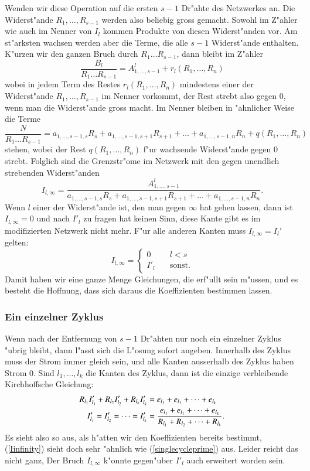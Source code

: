 Wenden wir diese Operation auf die ersten $s-1$ Dr"ahte des Netzwerkes
an. Die Widerst"ande $R_1,\dots,R_{s-1}$ werden also beliebig gross gemacht.
Sowohl im Z"ahler wie auch im Nenner von $I_l$ kommen Produkte von diesen
Widerst"anden vor. Am st"arksten wachsen werden aber die Terme, die
alle $s-1$ Widerst"ande enthalten. K"urzen wir den ganzen Bruch durch
$R_1\dots R_{s-1}$, dann bleibt im Z"ahler
\[
\frac{B_l}{R_1\dots R_{s-1}}=
A_{1,\dots,s-1}^l+r_l(R_1,\dots,R_n)
\]
wobei in jedem Term des Restes $r_l(R_1,\dots,R_n)$ mindestens einer
der Widerst"ande $R_1,\dots,R_{s-1}$ im Nenner vorkommt, der Rest
strebt also gegen $0$, wenn man die Widerst"ande gross macht.
Im Nenner bleiben in "ahnlicher Weise die Terme
\[
\frac{N}{R_1\dots R_{s-1}}=
a_{1,\dots,s-1,s}R_s+a_{1,\dots,s-1,s+1}R_{s+1}+\dots+a_{1,\dots,s-1,n}R_n
+q(R_1,\dots,R_n)
\]
stehen, wobei der Rest $q(R_1,\dots,R_n)$ f"ur wachsende Widerst"ande
gegen $0$ strebt. Folglich sind die Grenzstr"ome im Netzwerk mit den
gegen unendlich strebenden Widerst"anden
\begin{equation}
I_{l,\infty}=
\frac{A_{1,\dots,s-1}^l}{a_{1,\dots,s-1,s}R_s+a_{1,\dots,s-1,s+1}R_{s+1}+\dots+a_{1,\dots,s-1,n}R_n}.
\label{Iinfinity}
\end{equation}
Wenn $l$ einer der Widerst"ande ist, den man gegen $\infty$ hat gehen lassen,
dann ist $I_{l,\infty}=0$ und nach $I'_l$ zu fragen hat keinen Sinn, diese
Kante gibt es im modifizierten Netzwerk nicht mehr. F"ur alle anderen 
Kanten muss $I_{l,\infty}=I_l'$ gelten:
\begin{equation}
I_{l,\infty}=
\begin{cases}
0&\quad l< s\\
I'_l&\quad\text{sonst}.
\end{cases}
\label{Iequations}
\end{equation}
Damit haben wir eine ganze Menge Gleichungen, die erf"ullt sein
m"ussen, und es besteht die Hoffnung, dass sich daraus die Koeffizienten
bestimmen lassen.

\subsubsection{Ein einzelner Zyklus}
Wenn nach der Entfernung von $s-1$ Dr"ahten nur noch ein einzelner
Zyklus "ubrig bleibt, dann l"asst sich die L"osung sofort angeben.
Innerhalb des Zyklus muss der Strom immer gleich sein, und alle
Kanten ausserhalb des Zyklus haben Strom $0$. Sind $l_1,\dots,l_k$
die Kanten des Zyklus, dann ist die einzige verbleibende Kirchhoffsche
Gleichung:
\begin{align}
R_{l_1}I_{l_1}'+R_{l_2}I_{l_2}'+R_{l_k}I_{l_k}'&=e_{l_1}+e_{l_1}+\dots+e_{l_k}
\notag
\\
I_{l_1}'=I_{l_2}'=\dots=I_{l_k}'&=\frac{e_{l_1}+e_{l_1}+\dots+e_{l_k}}{R_{l_1}+R_{l_2}+\dots+R_{l_k}}.
\label{singlecycleprime}
\end{align}
Es sieht also so aus, als h"atten wir den Koeffizienten bereits
bestimmt, (\ref{Iinfinity}) sieht doch sehr "ahnlich wie
(\ref{singlecycleprime}) aus. Leider reicht das nicht ganz, Der Bruch
$I_{l,\infty}$ k"onnte gegen"uber $I'_l$ auch erweitert worden sein.

